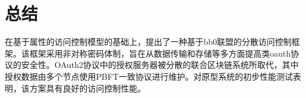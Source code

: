 
\chapter{总结}

在基于属性的访问控制模型的基础上，提出了一种基于bb0联盟的分散访问控制框架。该框架采用非对称密码体制，旨在从数据传输和存储等多方面提高类oauth协议的安全性。OAuth2协议中的授权服务器被分散的联合区块链系统所取代，其中授权数据由多个节点使用PBFT一致协议进行维护。对原型系统的初步性能测试表明，该方案具有良好的访问控制性能。